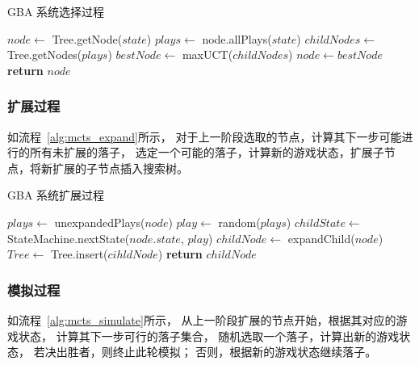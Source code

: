 \documentclass[UTF8,cs4size]{ctexart}
\begin{document}
\begin{algorithm}
	\caption{GBA 系统选择过程}
	\label{alg:mcts_select}
  \begin{algorithmic}[1]
      \State $node \gets$ Tree.getNode($state$)
        \State $plays \gets$ node.allPlays($state$)
        \State $childNodes \gets$ Tree.getNodes($plays$)
        \State $bestNode \gets$ maxUCT($childNodes$)
        \State $node \gets bestNode$
      \EndWhile
      \State \textbf{return} $node$
    \EndFunction
	\end{algorithmic}  
\end{algorithm}

\subsubsection{扩展过程}
如流程~\ref{alg:mcts_expand}所示，
对于上一阶段选取的节点，计算其下一步可能进行的所有未扩展的落子，
选定一个可能的落子，计算新的游戏状态，扩展子节点，将新扩展的子节点插入搜索树。

\begin{algorithm}
	\caption{GBA 系统扩展过程}
	\label{alg:mcts_expand}
  \begin{algorithmic}[1]
      \State $plays \gets$ unexpandedPlays($node$)
      \State $play \gets$ random($plays$)
      \State $childState \gets$ StateMachine.nextState($node.state$, $play$)
      \State $childNode \gets$ expandChild($node$)
      \State $Tree \gets$ Tree.insert($cihldNode$)
      \State \textbf{return} $childNode$
    \EndFunction
	\end{algorithmic}  
\end{algorithm}

\subsubsection{模拟过程}
如流程~\ref{alg:mcts_simulate}所示，
从上一阶段扩展的节点开始，根据其对应的游戏状态，
计算其下一步可行的落子集合，
随机选取一个落子，计算出新的游戏状态，
若决出胜者，则终止此轮模拟；
否则，根据新的游戏状态继续落子。
\end{document}
